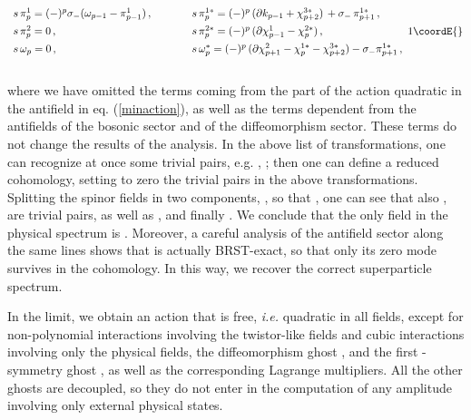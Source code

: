 \documentclass[a4paper,12pt]{article}
\begin{document}
\begin{eqnarray}
{\begin{array}{ll}
  s  \,  \pi_p^1  = (-)^p \sigma_- (\omega_{p-1} - \pi_{p-1}^1 )  \,,
  \hspace{1cm}      
&s \,  \pi_p^{1*}  = (-)^p \, (\partial k_{p-1} + \chi_{p+2}^{3*}
   ) \, + \sigma_- \, \pi_{p+1}^{1*}   
      \,, \vspace{.15cm}\\ 
  s  \,  \pi^2_p  =  0   \,, \hspace{1cm}     
&s \,  \pi_p^{2*}  =  (-)^p \, ( \partial \chi_{p-1}^1 - \chi_p^{2*} ) \,,
    \vspace{.15cm}\\ 
  s  \,  \omega_p  =  0  \,, \hspace{1cm}     
&s \,  \omega_p^*  =  (-)^p \, ( \partial \chi_{p+1}^2 -
   \chi_p^{1*} - 
    \chi_{p+2}^{3*} ) - \sigma_- \pi_{p+1}^{1*}  \,, 
\end{array}  
}{1}\coordE{}\end{eqnarray}
%
 \\
 where we have omitted the terms coming from the part of the action
 quadratic in the antifield in eq. (\ref{minaction}), as well as the
 terms dependent from the antifields of the bosonic sector and of the
 diffeomorphism sector. These terms do not change the results of the
 analysis.  In the above list of transformations, one can recognize at
 once some trivial pairs, e.g. \coordHE{}, \coordHE{}; then one can define a reduced cohomology, setting to zero
 the trivial pairs in the above transformations.  Splitting the spinor
 fields in two components, \myHighlight{$\kappa = (\kappa^+, \kappa^-)$}\coordHE{}, so that
 \coordHE{}, one can see that also \coordHE{}, \coordHE{} are trivial pairs, as
 well as \coordHE{}, and finally
 \coordHE{}. We conclude that the only field in the
 physical spectrum is \coordHE{}. Moreover, a careful analysis of
 the antifield sector along the same lines shows that \coordHE{} is actually BRST-exact, so that only its zero mode survives
 in the cohomology. In this way, we recover the correct superparticle
 spectrum.
 
 In the limit, we obtain an action that is free, {\it i.e.} quadratic
 in all fields, except for non-polynomial interactions involving the
 twistor-like fields and cubic interactions involving only the
 physical fields, the diffeomorphism ghost , and the first
 \myHighlight{$\kappa$}\coordHE{}-symmetry ghost \coordHE{}, as well as the corresponding Lagrange
 multipliers. All the other ghosts are decoupled, so they do not enter
 in the computation of any amplitude involving only external physical
 states.
\end{document}
